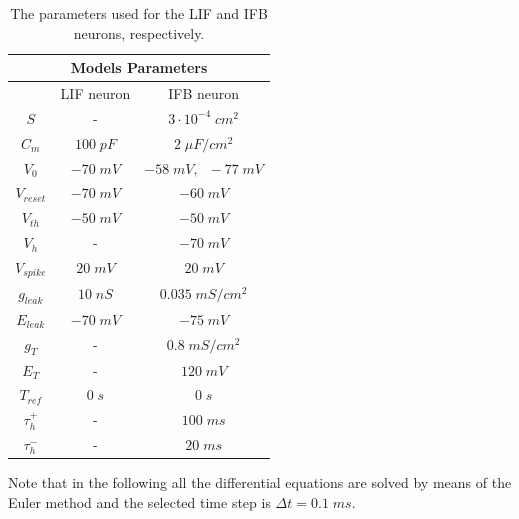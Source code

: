 \documentclass[11pt]{article}
\begin{document}
\begin{table}[!h]
    \begin{center}
        \begin{tabular}{ |c||c|c|  }
            \hline
            \multicolumn{3}{|c|}{Models Parameters}                      \\
            \hline
            {}               & LIF neuron  & IFB neuron                  \\
            \hline
            \(S\)            & -           & \(3\cdot{10^{-4}}\;cm^{2}\) \\
            \(C_{m}\)        & \(100\;pF\) & \(2\;\mu{F}/cm^{2}\)        \\
            \(V_{0}\)        & \(-70\;mV\) & \(-58\;mV,\;\;-77\;mV\)     \\
            \(V_{reset}\)    & \(-70\;mV\) & \(-60\;mV\)                 \\
            \(V_{th}\)       & \(-50\;mV\) & \(-50\;mV\)                 \\
            \(V_{h}\)        & -           & \(-70\;mV\)                 \\
            \(V_{spike}\)    & \(20\;mV\)  & \(20\;mV\)                  \\
            \(g_{leak}\)     & \(10\;nS\)  & \(0.035\;mS/cm^{2}\)        \\
            \(E_{leak}\)     & \(-70\;mV\) & \(-75\;mV\)                 \\
            \(g_{T}\)        & -           & \(0.8\;mS/cm^{2}\)          \\
            \(E_{T}\)        & -           & \(120\;mV\)                 \\
            \(T_{ref}\)      & \(0\;s\)    & \(0\;s\)                    \\
            \(\tau_{h}^{+}\) & -           & \(100\;ms\)                 \\
            \(\tau_{h}^{-}\) & -           & \(20\;ms\)                  \\
            \hline
        \end{tabular}
        \caption{\label{table:parameters}The parameters used for the LIF and IFB neurons, respectively.}
    \end{center}
\end{table}

Note that in the following all the differential equations are solved by means of the Euler
method and the selected time step is \(\Delta{t}=0.1\;ms\).
\end{document}
